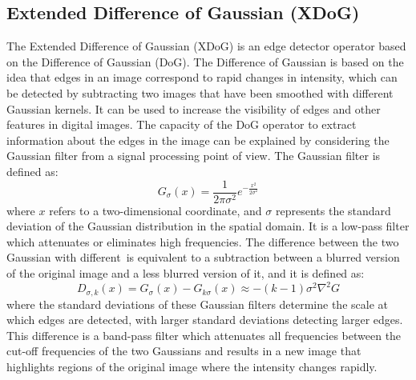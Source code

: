 \subsection{Extended Difference of Gaussian (XDoG)}
The Extended Difference of Gaussian (XDoG) is an edge detector operator based on the Difference of Gaussian (DoG). The Difference of Gaussian is based on the idea that edges in an image correspond to rapid changes in intensity, which can be detected by subtracting two images that have been smoothed with different Gaussian kernels. It can be used to increase the visibility of edges and other features in digital images.
The capacity of the DoG operator to extract information about the edges in the image can be explained by considering the Gaussian filter from a signal processing point of view. The Gaussian filter is defined as: 
\begin{equation}
    G_{\sigma}(x)=\frac{1}{2\pi \sigma^2}e^{-\frac{x^2}{2\sigma^2}}
\end{equation}
where $x$ refers to a two-dimensional coordinate, and $\sigma$ represents the standard deviation of the Gaussian distribution in the spatial domain. It is a low-pass filter which attenuates or eliminates high frequencies. The difference between the two Gaussian with different is equivalent to a subtraction between a blurred version of the original image and a less blurred version of it, and it is defined as: 
 \begin{equation}
     D_{\sigma, k}(x)=G_{\sigma}(x)-G_{k\sigma}(x) \approx -(k-1)\sigma^2 \nabla ^2 G
 \end{equation}
where the standard deviations of these Gaussian filters determine the scale at which edges are detected, with larger standard deviations detecting larger edges.
This difference is a band-pass filter which attenuates all frequencies between the cut-off frequencies of the two Gaussians and results in a new image that highlights regions of the original image where the intensity changes rapidly.

